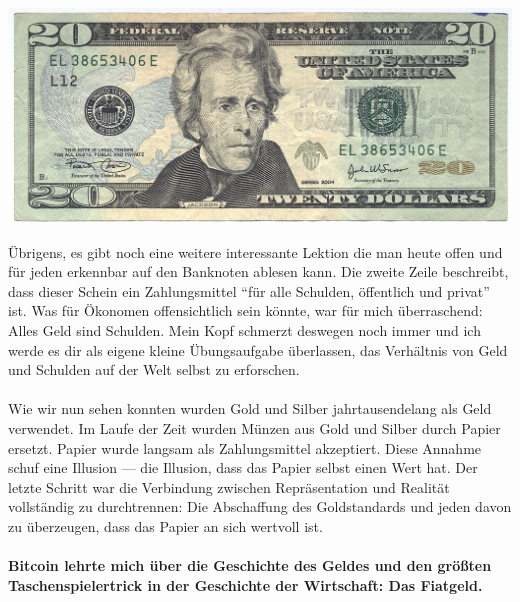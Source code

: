 \begin{center}
  \centering
  \includegraphics[width=\textwidth]{assets/images/us-dollar-2004.jpg}
  \label{fig:us-dollar-2004}
\end{center}

Übrigens, es gibt noch eine weitere interessante Lektion die man heute offen und
für jeden erkennbar auf den Banknoten ablesen kann. Die zweite Zeile beschreibt,
dass dieser Schein ein Zahlungsmittel \enquote{für alle Schulden, öffentlich und
privat} ist. Was für Ökonomen offensichtlich sein könnte, war für mich
überraschend: Alles Geld sind Schulden. Mein Kopf schmerzt deswegen noch immer
und ich werde es dir als eigene kleine Übungsaufgabe überlassen, das Verhältnis
von Geld und Schulden auf der Welt selbst zu erforschen.

\paragraph{}
Wie wir nun sehen konnten wurden Gold und Silber jahrtausendelang als Geld
verwendet. Im Laufe der Zeit wurden Münzen aus Gold und Silber durch Papier
ersetzt. Papier wurde langsam als Zahlungsmittel akzeptiert. Diese Annahme
schuf eine Illusion --- die Illusion, dass das Papier selbst einen Wert hat. Der
letzte Schritt war die Verbindung zwischen Repräsentation und Realität
vollständig zu durchtrennen: Die Abschaffung des Goldstandards und jeden davon
zu überzeugen, dass das Papier an sich wertvoll ist.

\paragraph{Bitcoin lehrte mich über die Geschichte des Geldes und den größten
Taschenspielertrick in der Geschichte der Wirtschaft: Das Fiatgeld.}

